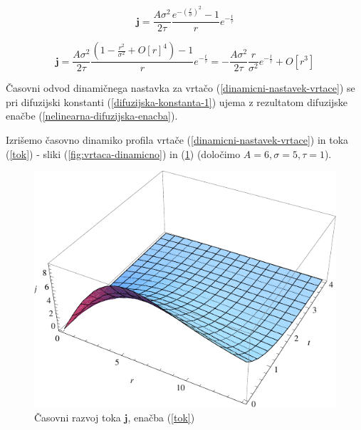 \documentclass[a4paper, oneside, 12pt]{book}
\begin{document}
  \begin{equation}
    \mathbf{j} = \frac{A \sigma^2}{2 \tau} \frac{e^{-(\frac{r}{\sigma})^2}-1}{r} e^{-\frac{t}{\tau}}
    \label{tok}
  \end{equation}

  \begin{equation}
    \mathbf{j} = \frac{A \sigma^2}{2 \tau} \frac{\left( 1-\frac{r^2}{\sigma ^2}+O[r]^4 \right)-1}{r} e^{-\frac{t}{\tau}} = -\frac{A \sigma^2}{2 \tau} \frac{r}{\sigma ^2} e^{-\frac{t}{\tau}} + O[r^3]
  \end{equation}

  Časovni odvod dinamičnega nastavka za vrtačo (\ref{dinamicni-nastavek-vrtace}) se pri difuzijski konstanti (\ref{difuzijska-konstanta-1}) ujema z rezultatom difuzijske enačbe (\ref{nelinearna-difuzijska-enacba}).

  Izrišemo časovno dinamiko profila vrtače (\ref{dinamicni-nastavek-vrtace}) in toka (\ref{tok}) - sliki (\ref{fig:vrtaca-dinamicno}) in (\ref{fig:tok-dinamicno}) (določimo $A=6,\sigma=5,\tau = 1$).

  \begin{figure}[H]
    \begin{center}
      \includegraphics[width=14cm]{slike/tok-dinamicno}
    \end{center}
    \caption{Časovni razvoj toka $\mathbf{j}$, enačba (\ref{tok})}
    \label{fig:tok-dinamicno}
  \end{figure}
\end{document}
